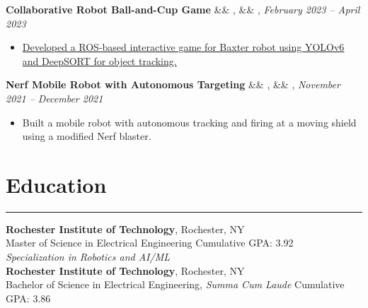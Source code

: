 \documentclass[letterpaper,10pt]{article}
\newcommand{\heading}[1]{%
    \vspace{-5mm} %
    \section*{#1}%
    \vspace{-3mm}%
    \noindent\hrule height 0.5pt %
    \vspace{4mm}%
}
\newcommand{\experience}[5]{%
    \vspace{-1mm}%
    \noindent\textbf{#1}%
    \ifx&#2&
    \else
        , \textit{#2}%
    \fi
    \ifx&#3&
    \else
        , #3%
    \fi
    \hfill \textit{#4} \\
    \vspace{-6.8mm}%
    \begin{itemize}[itemsep=-5pt]
        \setlength{\itemindent}{0em}
        #5
    \end{itemize}
}
\begin{document}
\experience
    {Collaborative Robot Ball-and-Cup Game}
    {}
    {}
    {February 2023 – April 2023}
    {
        \item \href{https://github.com/ryan-barry-99/DeepSORT-with-OAK-D-for-Collaborative-Robots/tree/main}{Developed a ROS-based interactive game for Baxter robot using YOLOv6 and DeepSORT for object tracking.}
    }
    
\experience
    {Nerf Mobile Robot with Autonomous Targeting}
    {}
    {}
    {November 2021 – December 2021}
    {
        \item Built a mobile robot with autonomous tracking and firing at a moving shield using a modified Nerf blaster.
    }


\vspace{-0.5em}
\heading{Education}
\vspace{-1mm}%
\noindent\textbf{Rochester Institute of Technology}, Rochester, NY \\
Master of Science in Electrical Engineering \hfill Cumulative GPA: 3.92 \\
\textit{Specialization in Robotics and AI/ML} \\
\noindent\textbf{Rochester Institute of Technology}, Rochester, NY \\
Bachelor of Science in Electrical Engineering, \textit{Summa Cum Laude} \hfill Cumulative GPA: 3.86 \\
\end{document}

